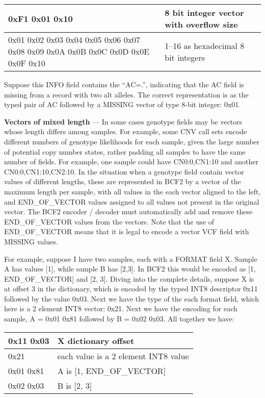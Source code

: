 \documentclass[8pt]{article}
\begin{document}
\vspace{0.3cm}
\begin{tabular}{|p{9cm} | p{6cm}|} \hline
0xF1 0x01 0x10 & 8 bit integer vector with overflow size \\ \hline
0x01 0x02 0x03 0x04 0x05 0x06 0x07 0x08 0x09 0x0A 0x0B 0x0C 0x0D 0x0E 0x0F 0x10 & 1--16 as hexadecimal 8 bit integers \\ \hline
\end{tabular}
\vspace{0.3cm}

Suppose this INFO field contains the ``AC=.'', indicating that the AC field is missing from a record with two alt alleles.
The correct representation is as the typed pair of AC followed by a MISSING vector of type 8-bit integer: 0x01.

\vspace{0.3cm}
\textbf{Vectors of mixed length} --- In some cases genotype fields may be vectors whose length differs among samples.  
For example, some CNV call sets encode different numbers of genotype likelihoods for each sample, given the large number of potential copy number states, rather padding all samples to have the same number of fields.  
For example, one sample could have CN0:0,CN1:10 and another CN0:0,CN1:10,CN2:10.  
In the situation when a genotype field contain vector values of different lengths, these are represented in BCF2 by a vector of the maximum length per sample, with all values in the each vector aligned to the left, and END\_OF\_VECTOR values assigned to all values not present in the original vector.  
The BCF2 encoder / decoder must automatically add and remove these END\_OF\_VECTOR values from the vectors. Note that the use of END\_OF\_VECTOR means that it is legal to encode a vector VCF field with MISSING values.

For example, suppose I have two samples, each with a FORMAT field X.  
Sample A has values [1], while sample B has [2,3].  
In BCF2 this would be encoded as [1, END\_OF\_VECTOR] and [2, 3]. 
Diving into the complete details, suppose X is at offset 3 in the dictionary, which is encoded by the typed INT8 descriptor 0x11 followed by the value 0x03. 
Next we have the type of the each format field, which here is a 2 element INT8 vector: 0x21.  
Next we have the encoding for each sample, A = 0x01 0x81 followed by B = 0x02 0x03.  
All together we have:

\vspace{0.3cm}
\begin{tabular}{|p{2cm} | l |} \hline
0x11 0x03 & X dictionary offset \\ \hline
0x21 & each value is a 2 element INT8 value \\ \hline
0x01 0x81 & A is [1, END\_OF\_VECTOR] \\ \hline
0x02 0x03 & B is [2, 3] \\ \hline
\end{tabular}
\vspace{0.3cm}
\end{document}

